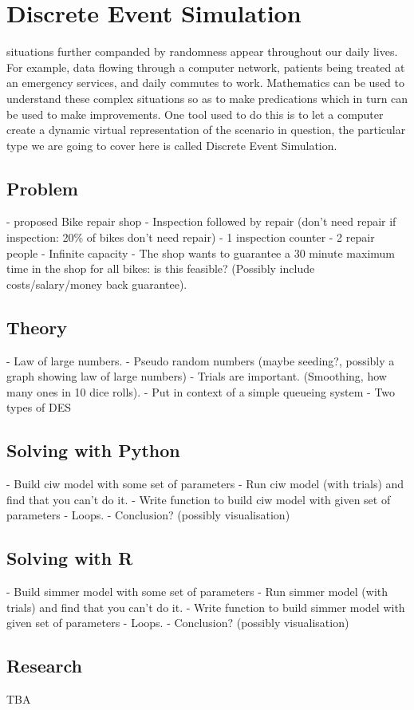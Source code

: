 \chapter[Discrete Event Simulation]{Discrete Event Simulation}

 situations further companded by randomness appear
throughout our daily lives. For example, data flowing through a computer
network, patients being treated at an emergency services, and daily commutes to
work.
Mathematics can be used to understand these complex situations so as to
make predications which in turn can be used to make improvements. One tool used
to do this is to let a computer create a dynamic virtual representation of the
scenario in question, the particular type we are going to cover here is called
Discrete Event Simulation.

\section{Problem}\label{sec:problem}

- proposed Bike repair shop
- Inspection followed by repair (don't need repair if inspection: 20\% of bikes
don't need repair)
- 1 inspection counter
- 2 repair people
- Infinite capacity
- The shop wants to guarantee a 30 minute maximum time in the shop for all
bikes: is this feasible? (Possibly include costs/salary/money back guarantee).

\section{Theory}\label{sec:theory}

- Law of large numbers.
- Pseudo random numbers (maybe seeding?, possibly a graph showing law of large
numbers)
- Trials are important. (Smoothing, how many ones in 10 dice rolls).
- Put in context of a simple queueing system
- Two types of DES

\section{Solving with Python}\label{sec:solving-with-python}

- Build ciw model with some set of parameters
- Run ciw model (with trials) and find that you can't do it.
- Write function to build ciw model with given set of parameters
- Loops.
- Conclusion? (possibly visualisation)


\section{Solving with R}\label{sec:solving-with-R}

- Build simmer model with some set of parameters
- Run simmer model (with trials) and find that you can't do it.
- Write function to build simmer model with given set of parameters
- Loops.
- Conclusion? (possibly visualisation)

\section{Research}\label{sec:research}

TBA
